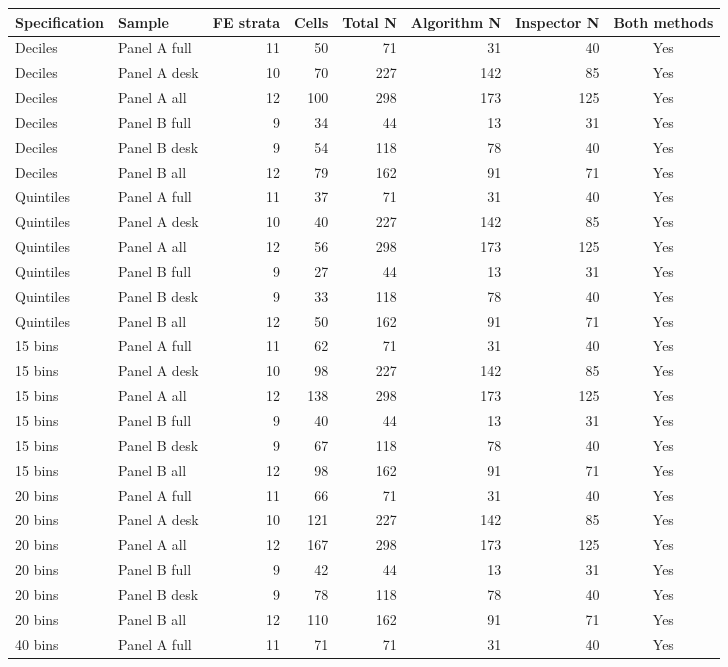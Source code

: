 \begin{tabular}{llrrrrrc}
\toprule
Specification & Sample & FE strata & Cells & Total N & Algorithm N & Inspector N & Both methods \\
\midrule
Deciles & Panel A full & 11 & 50 & 71 & 31 & 40 & Yes \\
Deciles & Panel A desk & 10 & 70 & 227 & 142 & 85 & Yes \\
Deciles & Panel A all & 12 & 100 & 298 & 173 & 125 & Yes \\
Deciles & Panel B full & 9 & 34 & 44 & 13 & 31 & Yes \\
Deciles & Panel B desk & 9 & 54 & 118 & 78 & 40 & Yes \\
Deciles & Panel B all & 12 & 79 & 162 & 91 & 71 & Yes \\
Quintiles & Panel A full & 11 & 37 & 71 & 31 & 40 & Yes \\
Quintiles & Panel A desk & 10 & 40 & 227 & 142 & 85 & Yes \\
Quintiles & Panel A all & 12 & 56 & 298 & 173 & 125 & Yes \\
Quintiles & Panel B full & 9 & 27 & 44 & 13 & 31 & Yes \\
Quintiles & Panel B desk & 9 & 33 & 118 & 78 & 40 & Yes \\
Quintiles & Panel B all & 12 & 50 & 162 & 91 & 71 & Yes \\
15 bins & Panel A full & 11 & 62 & 71 & 31 & 40 & Yes \\
15 bins & Panel A desk & 10 & 98 & 227 & 142 & 85 & Yes \\
15 bins & Panel A all & 12 & 138 & 298 & 173 & 125 & Yes \\
15 bins & Panel B full & 9 & 40 & 44 & 13 & 31 & Yes \\
15 bins & Panel B desk & 9 & 67 & 118 & 78 & 40 & Yes \\
15 bins & Panel B all & 12 & 98 & 162 & 91 & 71 & Yes \\
20 bins & Panel A full & 11 & 66 & 71 & 31 & 40 & Yes \\
20 bins & Panel A desk & 10 & 121 & 227 & 142 & 85 & Yes \\
20 bins & Panel A all & 12 & 167 & 298 & 173 & 125 & Yes \\
20 bins & Panel B full & 9 & 42 & 44 & 13 & 31 & Yes \\
20 bins & Panel B desk & 9 & 78 & 118 & 78 & 40 & Yes \\
20 bins & Panel B all & 12 & 110 & 162 & 91 & 71 & Yes \\
40 bins & Panel A full & 11 & 71 & 71 & 31 & 40 & Yes \\

\end{tabular}
